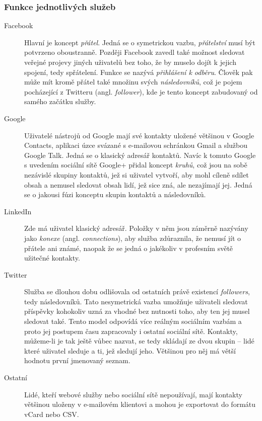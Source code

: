 \documentclass[12pt,oneside,final]{fithesis2}
\begin{document}
\subsubsection*{Funkce jednotlivých služeb}
\begin{description}
    \item[Facebook]
        Hlavní je koncept \emph{přátel}. Jedná se o symetrickou vazbu, \emph{přátelství} musí být potvrzeno oboustranně. Později Facebook zavedl také možnost sledovat veřejné projevy jiných uživatelů bez toho, že by muselo dojít k jejich spojení, tedy spřátelení. Funkce se nazývá \emph{přihlášení k odběru}. Člověk pak může mít kromě přátel také množinu svých \emph{následovníků}, což je pojem pocházející z Twitteru (angl. \emph{follower}), kde je tento koncept zabudovaný od samého začátku služby.

    \item[Google]
        Uživatelé nástrojů od Google mají své kontakty uložené většinou v Google Contacts, aplikaci úzce svázané s e-mailovou schránkou Gmail a službou Google Talk. Jedná se o klasický adresář kontaktů. Navíc k tomuto Google s uvedením sociální sítě Google+ přidal koncept \emph{kruhů}, což jsou na sobě nezávislé skupiny kontaktů, jež si uživatel vytvoří, aby mohl cíleně sdílet obsah a nemusel sledovat obsah lidí, jež sice zná, ale nezajímají jej. Jedná se o jakousi fúzi konceptu skupin kontaktů a následovníků.

    \item[LinkedIn]
        Zde má uživatel klasický adresář. Položky v něm jsou záměrně nazývány jako \emph{konexe} (angl. \emph{connections}), aby služba zdůraznila, že nemusí jít o přátele ani známé, naopak že se jedná o jakékoliv v profesním světě užitečné kontakty.

    \item[Twitter]
        Služba se dlouhou dobu odlišovala od ostatních právě existencí \emph{followers}, tedy následovníků. Tato nesymetrická vazba umožňuje uživateli sledovat příspěvky kohokoliv uzná za vhodné bez nutnosti toho, aby ten jej musel sledovat také. Tento model odpovídá více reálným sociálním vazbám a proto jej postupem času zapracovaly i ostatní sociální sítě. Kontakty, můžeme-li je tak ještě vůbec nazvat, se tedy skládají ze dvou skupin -- lidé které uživatel sleduje a ti, jež sledují jeho. Většinou pro něj má větší hodnotu první jmenovaný seznam.

    \item[Ostatní]
        Lidé, kteří webové služby nebo sociální sítě nepoužívají, mají kontakty většinou uloženy v e-mailovém klientovi a mohou je exportovat do formátu vCard nebo CSV.
\end{description}
\end{document}
